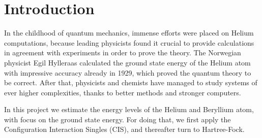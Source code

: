 \section{Introduction} \label{sec:introduction}
In the childhood of quantum mechanics, immense efforts were placed on Helium computations, because leading physicists found it crucial to provide calculations in agreement with experiments in order to prove the theory. The Norwegian physicist Egil Hylleraas calculated the ground state energy of the Helium atom with impressive accuracy already in 1929, which proved the quantum theory to be correct. After that, physicists and chemists have managed to study systems of ever higher complexities, thanks to better methods and stronger computers.

In this project we estimate the energy levels of the Helium and Beryllium atom, with focus on the ground state energy. For doing that, we first apply the Configuration Interaction Singles (CIS), and thereafter turn to Hartree-Fock. 


